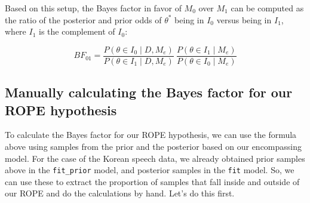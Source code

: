 \documentclass[
  doc,
  floatsintext,
  longtable,
  nolmodern,
  notxfonts,
  notimes,
  colorlinks=true,linkcolor=blue,citecolor=blue,urlcolor=blue]{apa7}
\begin{document}
Based on this setup, the Bayes factor in favor of \(M_0\) over \(M_1\)
can be computed as the ratio of the posterior and prior odds of
\(\theta^*\) being in \(I_0\) versus being in \(I_1\), where \(I_1\) is
the complement of \(I_0\):

\[
BF_{01} = \frac{P(\theta \in I_{0} \mid D, M_{e})}{P(\theta \in I_{1} \mid D, M_{e})} \ \frac{P(\theta \in I_{1} \mid  M_{e})}{P(\theta \in I_{0} \mid M_{e})}
\]

\begin{figure}[!tbp]

\caption{\label{fig-savage-dickey_TR}}


\end{figure}%

\subsection{Manually calculating the Bayes factor for our ROPE
hypothesis}\label{manually-calculating-the-bayes-factor-for-our-rope-hypothesis}

To calculate the Bayes factor for our ROPE hypothesis, we can use the
formula above using samples from the prior and the posterior based on
our encompassing model. For the case of the Korean speech data, we
already obtained prior samples above in the \texttt{fit\_prior} model,
and posterior samples in the \texttt{fit} model. So, we can use these to
extract the proportion of samples that fall inside and outside of our
ROPE and do the calculations by hand. Let's do this first.
\end{document}
